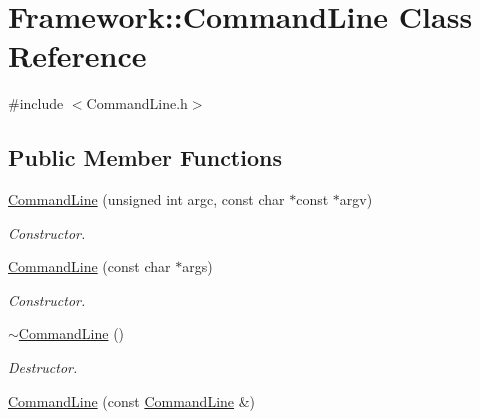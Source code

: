 \hypertarget{classFramework_1_1CommandLine}{
\section{Framework::CommandLine Class Reference}
\label{classFramework_1_1CommandLine}
}


{\ttfamily \#include $<$CommandLine.h$>$}\subsection*{Public Member Functions}
\begin{DoxyCompactItemize}
\item 
\hypertarget{classFramework_1_1CommandLine_a33793461121e501b2cea4680d5b4f55a}{
\hyperlink{classFramework_1_1CommandLine_a33793461121e501b2cea4680d5b4f55a}{CommandLine} (unsigned int argc, const char $\ast$const $\ast$argv)}
\label{classFramework_1_1CommandLine_a33793461121e501b2cea4680d5b4f55a}

\begin{DoxyCompactList}\small\item\em Constructor. \item\end{DoxyCompactList}\item 
\hypertarget{classFramework_1_1CommandLine_a6afb1cc3aa958b09fb44b610b85eddc9}{
\hyperlink{classFramework_1_1CommandLine_a6afb1cc3aa958b09fb44b610b85eddc9}{CommandLine} (const char $\ast$args)}
\label{classFramework_1_1CommandLine_a6afb1cc3aa958b09fb44b610b85eddc9}

\begin{DoxyCompactList}\small\item\em Constructor. \item\end{DoxyCompactList}\item 
\hypertarget{classFramework_1_1CommandLine_a796f657083b0b5d79a99459792b495c4}{
\hyperlink{classFramework_1_1CommandLine_a796f657083b0b5d79a99459792b495c4}{$\sim$CommandLine} ()}
\label{classFramework_1_1CommandLine_a796f657083b0b5d79a99459792b495c4}

\begin{DoxyCompactList}\small\item\em Destructor. \item\end{DoxyCompactList}\item 
\hypertarget{classFramework_1_1CommandLine_a9c24d7a27d93ac29f1c0799482f85e26}{
\hyperlink{classFramework_1_1CommandLine_a9c24d7a27d93ac29f1c0799482f85e26}{CommandLine} (const \hyperlink{classFramework_1_1CommandLine}{CommandLine} \&)}
\label{classFramework_1_1CommandLine_a9c24d7a27d93ac29f1c0799482f85e26}


\end{DoxyCompactItemize}
